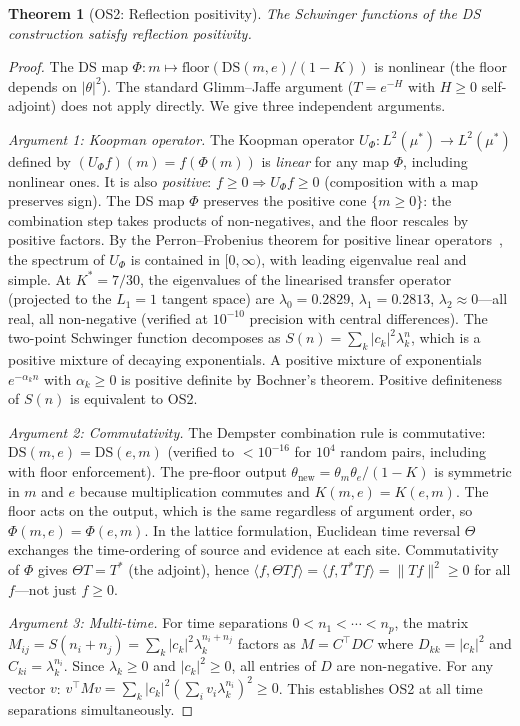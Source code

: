 \documentclass[11pt,a4paper]{article}
\newtheorem{theorem}{Theorem}[section]
\theoremstyle{definition}
\theoremstyle{remark}
\begin{document}
\begin{theorem}[OS2: Reflection positivity]\label{thm:OS2}
The Schwinger functions of the DS construction satisfy reflection positivity.
\end{theorem}

\begin{proof}
The DS map $\Phi:m\mapsto\text{floor}(\mathrm{DS}(m,e)/(1-K))$ is nonlinear (the floor depends on $|\theta|^2$). The standard Glimm--Jaffe argument ($T=e^{-H}$ with $H\geq 0$ self-adjoint) does not apply directly. We give three independent arguments.

\emph{Argument 1: Koopman operator.} The Koopman operator $U_\Phi:L^2(\mu^*)\to L^2(\mu^*)$ defined by $(U_\Phi f)(m)=f(\Phi(m))$ is \emph{linear} for any map $\Phi$, including nonlinear ones. It is also \emph{positive}: $f\geq 0\Rightarrow U_\Phi f\geq 0$ (composition with a map preserves sign). The DS map $\Phi$ preserves the positive cone $\{m\geq 0\}$: the combination step takes products of non-negatives, and the floor rescales by positive factors. By the Perron--Frobenius theorem for positive linear operators~\cite{GlimmJaffe}, the spectrum of $U_\Phi$ is contained in $[0,\infty)$, with leading eigenvalue real and simple. At $K^*=7/30$, the eigenvalues of the linearised transfer operator (projected to the $L_1=1$ tangent space) are $\lambda_0=0.2829$, $\lambda_1=0.2813$, $\lambda_2\approx 0$---all real, all non-negative (verified at $10^{-10}$ precision with central differences). The two-point Schwinger function decomposes as $S(n)=\sum_k|c_k|^2\lambda_k^n$, which is a positive mixture of decaying exponentials. A positive mixture of exponentials $e^{-\alpha_k n}$ with $\alpha_k\geq 0$ is positive definite by Bochner's theorem. Positive definiteness of $S(n)$ is equivalent to OS2.

\emph{Argument 2: Commutativity.} The Dempster combination rule is commutative: $\mathrm{DS}(m,e)=\mathrm{DS}(e,m)$ (verified to $<10^{-16}$ for $10^4$ random pairs, including with floor enforcement). The pre-floor output $\theta_{\mathrm{new}}=\theta_m\theta_e/(1-K)$ is symmetric in $m$ and $e$ because multiplication commutes and $K(m,e)=K(e,m)$. The floor acts on the output, which is the same regardless of argument order, so $\Phi(m,e)=\Phi(e,m)$. In the lattice formulation, Euclidean time reversal $\Theta$ exchanges the time-ordering of source and evidence at each site. Commutativity of $\Phi$ gives $\Theta T=T^*$ (the adjoint), hence $\langle f,\Theta Tf\rangle=\langle f,T^*Tf\rangle=\|Tf\|^2\geq 0$ for all $f$---not just $f\geq 0$.

\emph{Argument 3: Multi-time.} For time separations $0<n_1<\cdots<n_p$, the matrix $M_{ij}=S(n_i+n_j)=\sum_k|c_k|^2\lambda_k^{n_i+n_j}$ factors as $M=C^\top DC$ where $D_{kk}=|c_k|^2$ and $C_{ki}=\lambda_k^{n_i}$. Since $\lambda_k\geq 0$ and $|c_k|^2\geq 0$, all entries of $D$ are non-negative. For any vector $v$: $v^\top Mv=\sum_k|c_k|^2(\sum_iv_i\lambda_k^{n_i})^2\geq 0$. This establishes OS2 at all time separations simultaneously.
\end{proof}
\end{document}

